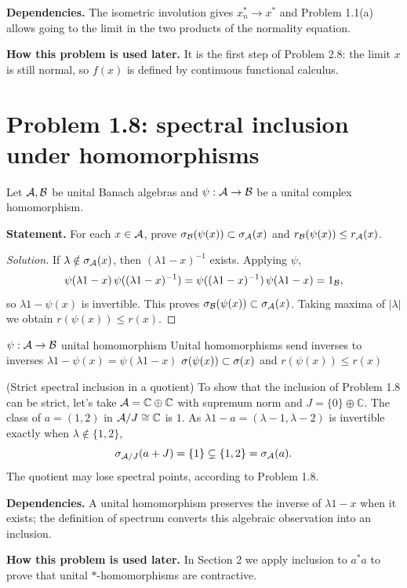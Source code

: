 \noindent\textbf{Dependencies.} The isometric involution gives $x_n^*\to x^*$ and Problem 1.1(a) allows going to the limit in the two products of the normality equation.

\noindent\textbf{How this problem is used later.} It is the first step of Problem 2.8: the limit $x$ is still normal, so $f(x)$ is defined by continuous functional calculus.

\section{Problem 1.8: spectral inclusion under homomorphisms}

Let $\mathcal A,\mathcal B$ be unital Banach algebras and $\psi:\mathcal A\to\mathcal B$ be a unital complex homomorphism.

\noindent\textbf{Statement.} For each $x\in\mathcal A$, prove $\sigma_\mathcal B(\psi(x))\subset\sigma_\mathcal A(x)$ and $r_\mathcal B(\psi(x))\le r_\mathcal A(x)$.

\begin{proof}[Solution]
If $\lambda\notin\sigma_\mathcal A(x)$, then $(\lambda1-x)^{-1}$ exists. Applying $\psi$,
\[
 \psi(\lambda1-x)\,\psi((\lambda1-x)^{-1})
 =\psi((\lambda1-x)^{-1})\,\psi(\lambda1-x)=1_\mathcal B,
\]
so $\lambda1-\psi(x)$ is invertible. This proves
$\sigma_\mathcal B(\psi(x))\subset\sigma_\mathcal A(x)$. Taking maxima of $|\lambda|$ we obtain
$r(\psi(x))\le r(x)$.
\end{proof}

\proofdiagram
{$\psi:\mathcal A\to\mathcal B$ unital homomorphism}
{Unital homomorphisms send inverses to inverses}
{$\lambda1-\psi(x)=\psi(\lambda1-x)$}
{$\sigma(\psi(x))\subset\sigma(x)$ and $r(\psi(x))\le r(x)$}

\begin{cthejemplo}{(Strict spectral inclusion in a quotient)}
To show that the inclusion of Problem 1.8 can be strict, let's take
$\mathcal A=\mathbb C\oplus\mathbb C$ with supremum norm and $J=\{0\}\oplus\mathbb C$.
The class of $a=(1,2)$ in $\mathcal A/J\cong\mathbb C$ is $1$.
As $\lambda1-a=(\lambda-1,\lambda-2)$ is invertible exactly when
$\lambda\notin\{1,2\}$,
\[
 \sigma_{\mathcal A/J}(a+J)=\{1\}\subsetneq\{1,2\}=\sigma_\mathcal A(a).
\]
The quotient may lose spectral points, according to Problem 1.8.
\end{cthejemplo}

\noindent\textbf{Dependencies.} A unital homomorphism preserves the inverse of $\lambda1-x$ when it exists; the definition of spectrum converts this algebraic observation into an inclusion.

\noindent\textbf{How this problem is used later.} In Section 2 we apply inclusion to $a^*a$ to prove that unital $*$-homomorphisms are contractive.


